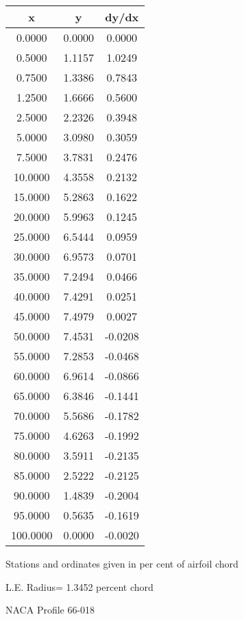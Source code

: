 \documentclass[11pt]{book}
\begin{document}
 \vspace{8mm}
 \begin{tabular}{|c|c|c|} \hline 
  x  &  y  &  dy/dx \\
 \hline
0.0000 & 0.0000 & 0.0000 \\
0.5000 & 1.1157 & 1.0249 \\
0.7500 & 1.3386 & 0.7843 \\
1.2500 & 1.6666 & 0.5600 \\
2.5000 & 2.2326 & 0.3948 \\
5.0000 & 3.0980 & 0.3059 \\
7.5000 & 3.7831 & 0.2476 \\
10.0000 & 4.3558 & 0.2132 \\
15.0000 & 5.2863 & 0.1622 \\
20.0000 & 5.9963 & 0.1245 \\
25.0000 & 6.5444 & 0.0959 \\
30.0000 & 6.9573 & 0.0701 \\
35.0000 & 7.2494 & 0.0466 \\
40.0000 & 7.4291 & 0.0251 \\
45.0000 & 7.4979 & 0.0027 \\
50.0000 & 7.4531 & -0.0208 \\
55.0000 & 7.2853 & -0.0468 \\
60.0000 & 6.9614 & -0.0866 \\
65.0000 & 6.3846 & -0.1441 \\
70.0000 & 5.5686 & -0.1782 \\
75.0000 & 4.6263 & -0.1992 \\
80.0000 & 3.5911 & -0.2135 \\
85.0000 & 2.5222 & -0.2125 \\
90.0000 & 1.4839 & -0.2004 \\
95.0000 & 0.5635 & -0.1619 \\
100.0000 & 0.0000 & -0.0020 \\
 \hline
 \end{tabular}
 \vspace{8mm}


Stations and ordinates given in per cent of airfoil chord 


L.E. Radius=  1.3452 percent chord
 \newpage
  \label{p66-018}
 \begin{Large}
 NACA Profile 66-018
 \end{Large}
  
\end{document}
